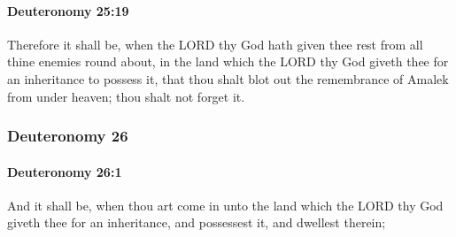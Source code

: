 		\paragraph{Deuteronomy 25:19} %
			\label{DEUTERONOMY-25-19}

			Therefore it shall be, when the LORD thy God hath given thee rest from all thine enemies round about, in the land which the LORD thy God giveth thee for an inheritance to possess it, that thou shalt blot out the remembrance of Amalek from under heaven; thou shalt not forget it.

	\subsubsection{Deuteronomy 26} %
		\label{DEUTERONOMY-26}

		\paragraph{Deuteronomy 26:1} %
			\label{DEUTERONOMY-26-1}

			And it shall be, when thou art come in unto the land which the LORD thy God giveth thee for an inheritance, and possessest it, and dwellest therein;


